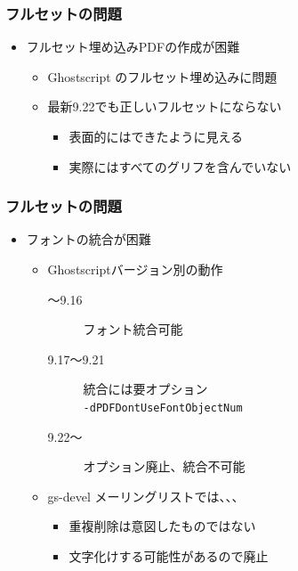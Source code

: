 \documentclass[unicode,17pt]{beamer}
\begin{document}
\begin{frame}[fragile]\frametitle{フルセットの問題}
  \begin{itemize}
  \item フルセット埋め込みPDFの作成が困難
    \begin{itemize}
    \item Ghostscript のフルセット埋め込みに問題
    \item 最新9.22でも正しいフルセットにならない
      \begin{itemize}
      \item 表面的にはできたように見える
      \item 実際にはすべてのグリフを含んでいない
      \end{itemize}
    \end{itemize}
  \end{itemize}
\end{frame}
        
\begin{frame}[fragile]\frametitle{フルセットの問題}
  \begin{itemize}
  \item フォントの統合が困難
    \begin{itemize}
    \item Ghostscriptバージョン別の動作
      \begin{description}
      \item[\phantom{9.16}～9.16] フォント統合可能
      \item[9.17～9.21] 統合には要オプション \\
        {\footnotesize\verb|-dPDFDontUseFontObjectNum|}
      \item[9.22～\phantom{9.22}] オプション廃止、統合不可能
      \end{description}
    \item gs-devel メーリングリストでは、、、
      \begin{itemize}
      \item 重複削除は意図したものではない
      \item 文字化けする可能性があるので廃止
      \end{itemize}
    \end{itemize}
  \end{itemize}
\end{frame}
\end{document}
